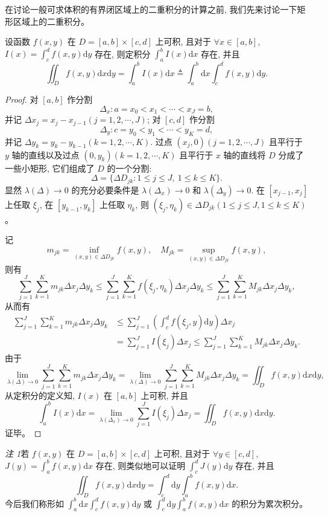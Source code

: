 \documentclass[UTF8,12pt,a4paper,fontset=fandol]{ctexart}
\begin{document}
在讨论一般可求体积的有界闭区域上的二重积分的计算之前, 我们先来讨论一下矩形区域上的二重积分。

\begin{theorem}\label{course-theorem-15-3-1}\quad 设函数 $f(x,y)$ 在 $D=[a,b]\times[c,d]$ 上可积, 且对于 $\forall x\in[a,b]$, $I(x)=\int_c^d f(x,y)\mathrm dy$ 存在, 则定积分 $\int_a^b I(x)\mathrm dx$ 存在, 并且
\[
  \iint_D f(x,y)\mathrm dx\mathrm dy
  =\int_a^b I(x)\mathrm dx
  \triangleq\int_a^b\mathrm dx\int_c^d f(x,y)\mathrm dy.
\]

\end{theorem}
\begin{proof}\quad 对 $[a,b]$ 作分割
\[
  \Delta_x:a=x_0<x_1<\cdots<x_J=b,
\]
并记 $\Delta x_j=x_j-x_{j-1}(j=1,2,\cdots,J)$; 对 $[c,d]$ 作分割
\[
  \Delta_y:c=y_0<y_1<\cdots<y_K=d,
\]
并记 $\Delta y_k=y_k-y_{k-1}(k=1,2,\cdots,K)$. 过点 $(x_j,0)(j=1,2,\cdots,J)$ 且平行于 $y$ 轴的直线以及过点 $(0,y_k)(k=1,2,\cdots,K)$ 且平行于 $x$ 轴的直线将 $D$ 分成了一些小矩形, 它们组成了 $D$ 的一个分割:
\[
  \Delta=\{\Delta D_{jk}:1\leqslant j\leqslant J,\ 1\leqslant k\leqslant K\}.
\]
显然 $\lambda(\Delta)\to0$ 的充分必要条件是 $\lambda(\Delta_x)\to0$ 和 $\lambda(\Delta_y)\to0$. 在 $[x_{j-1},x_j]$ 上任取 $\xi_j$, 在 $[y_{k-1},y_k]$ 上任取 $\eta_k$, 则 $(\xi_j,\eta_k)\in\Delta D_{jk}(1\leqslant j\leqslant J,1\leqslant k\leqslant K)$。

记
\[
  m_{jk}=\inf_{(x,y)\in\Delta D_{jk}}f(x,y),\quad
  M_{jk}=\sup_{(x,y)\in\Delta D_{jk}}f(x,y),
\]
则有
\[
  \sum_{j=1}^J\sum_{k=1}^K m_{jk}\Delta x_j\Delta y_k
  \leqslant \sum_{j=1}^J\sum_{k=1}^K f(\xi_j,\eta_k)\Delta x_j\Delta y_k
  \leqslant \sum_{j=1}^J\sum_{k=1}^K M_{jk}\Delta x_j\Delta y_k,
\]
从而有
\[
\begin{aligned}
  \sum_{j=1}^J\sum_{k=1}^K m_{jk}\Delta x_j\Delta y_k
  &\leqslant \sum_{j=1}^J\left(\int_c^d f(\xi_j,y)\mathrm dy\right)\Delta x_j\\
  &=\sum_{j=1}^J I(\xi_j)\Delta x_j
  \leqslant \sum_{j=1}^J\sum_{k=1}^K M_{jk}\Delta x_j\Delta y_k.
\end{aligned}
\]
由于
\[
  \lim_{\lambda(\Delta)\to0}\sum_{j=1}^J\sum_{k=1}^K m_{jk}\Delta x_j\Delta y_k
  =
  \lim_{\lambda(\Delta)\to0}\sum_{j=1}^J\sum_{k=1}^K M_{jk}\Delta x_j\Delta y_k
  =
  \iint_D f(x,y)\mathrm dx\mathrm dy,
\]
从定积分的定义知, $I(x)$ 在 $[a,b]$ 上可积, 并且
\[
  \int_a^b I(x)\mathrm dx
  =
  \lim_{\lambda(\Delta_x)\to0}\sum_{j=1}^J I(\xi_j)\Delta x_j
  =
  \iint_D f(x,y)\mathrm dx\mathrm dy.
\]
证毕。

\end{proof}
\noindent\emph{注 1}\quad 若 $f(x,y)$ 在 $D=[a,b]\times[c,d]$ 上可积, 且对于 $\forall y\in[c,d]$, $J(y)=\int_a^b f(x,y)\mathrm dx$ 存在, 则类似地可以证明 $\int_c^d J(y)\mathrm dy$ 存在, 并且
\[
  \iint_D f(x,y)\mathrm dx\mathrm dy
  =
  \int_c^d\mathrm dy\int_a^b f(x,y)\mathrm dx.
\]
今后我们称形如 $\int_a^b\mathrm dx\int_c^d f(x,y)\mathrm dy$ 或 $\int_c^d\mathrm dy\int_a^b f(x,y)\mathrm dx$ 的积分为累次积分。
\end{document}
